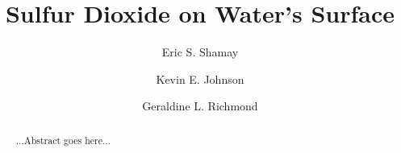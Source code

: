 \documentclass{article}
\title{Sulfur Dioxide on Water's Surface}
\author{Eric S. Shamay \and Kevin E. Johnson \and Geraldine L. Richmond}
\begin{document}
\newcommand{\suldiox}{SO$_2$}
\newcommand{\ang}{\,$\textrm{\AA}$}
\newcommand{\angs}{\ang}
\newcommand{\wat}{H$_2$O}

\maketitle

\doublespacing


\begin{abstract}
	...Abstract goes here...
\end{abstract}










\end{document}
